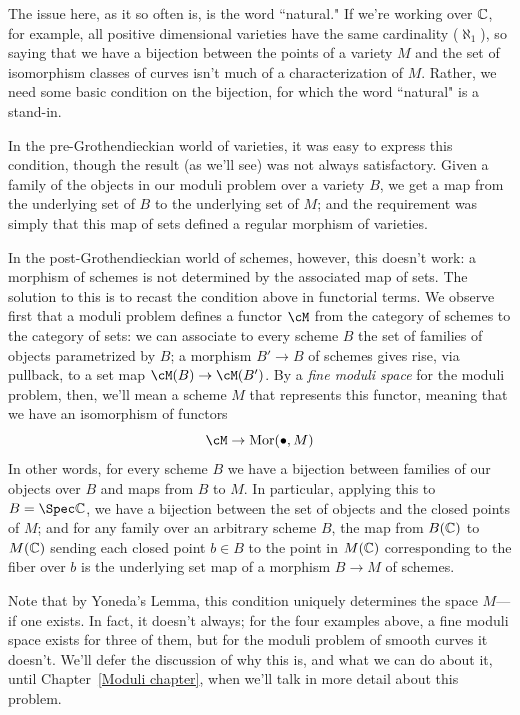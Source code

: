 The issue here, as it so often is,  is the word ``natural." If we're working over $\CC$, for example, all positive dimensional varieties have the same cardinality ($\aleph_1$), so saying that we have a bijection between the points of a variety $M$ and the set of isomorphism classes of curves isn't much of a characterization of $M$. Rather, we need some basic condition on the bijection, for which the word ``natural" is a stand-in. 

In the pre-Grothendieckian world of varieties, it was easy to express this condition, though the result (as we'll see) was not always satisfactory. Given a family of the objects in our moduli problem over a variety $B$, we get a map from the underlying set of $B$ to the underlying set of $M$; and the requirement was simply that this map of sets defined a regular morphism of varieties.

In the post-Grothendieckian world of schemes, however, this doesn't work: a morphism of schemes is not determined by the associated map of sets. 
The solution to this is to recast the condition above in functorial terms. We observe first that a moduli problem defines a functor $\cM$ from the category of schemes to the category of sets: we can associate to every scheme $B$ the set of families of objects parametrized by $B$; a morphism $B' \to B$ of schemes gives rise, via pullback,  to a set map $\cM(B) \to \cM(B')$. By a \emph{fine moduli space} for the moduli problem, then, we'll mean a scheme $M$ that represents this functor, meaning that we have an isomorphism of functors
$$
\cM \to {\rm Mor}(\bullet, M)
$$
In other words, for every scheme $B$ we have a bijection between families of our objects over $B$ and maps from $B$ to $M$. In particular, applying this to $B = \Spec \CC$, we have a bijection between the set of objects and the closed points of $M$; and for any family over an arbitrary scheme $B$, the map from $B(\CC)$ to $M(\CC)$ sending each closed point  $b \in B$ to the point in $M(\CC)$ corresponding to the fiber over $b$ is the underlying set map of a morphism $B \to M$ of schemes.

Note that by Yoneda's Lemma, this condition uniquely determines the space $M$---if one exists. In fact, it doesn't always; for the four examples above, a fine moduli space exists for three of them, but for the moduli problem of smooth curves it doesn't. We'll defer the discussion of why this is, and what we can do about it, until Chapter~\ref{Moduli chapter}, when we'll talk in more detail about this problem.

